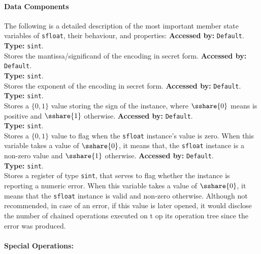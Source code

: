 \paragraph{Data Components}
The following is a detailed description of the most important member state variables of \verb|sfloat|, their behaviour, and properties:		
		\textbf{Accessed by:} \verb|Default|.\\
		\textbf{Type:} \verb|sint|.\\
		Stores the mantissa/significand of the encoding in secret form.
		\textbf{Accessed by:} \verb|Default|.\\
		\textbf{Type:} \verb|sint|.\\
		Stores the exponent of the encoding in secret form.
		\textbf{Accessed by:} \verb|Default|.\\
		\textbf{Type:} \verb|sint|.\\
		Stores a $\{0,1\}$ value storing the sign of the instance, where $\sshare{0}$ means is positive and $\sshare{1}$ otherwise.		
		\textbf{Accessed by:} \verb|Default|.\\
		\textbf{Type:} \verb|sint|.\\
		Stores a $\{0,1\}$ value to flag when the \verb|sfloat| instance's value is zero. 
		When this variable takes a value of $\sshare{0}$, it means that, the \verb|sfloat| instance is a non-zero value and $\sshare{1}$ otherwise.		
		\textbf{Accessed by:} \verb|Default|.\\
		\textbf{Type:} \verb|sint|.\\
		Stores a register of type \verb|sint|, 
		that serves to flag whether the instance is reporting a numeric error. 
		When this variable takes a value of $\sshare{0}$, 
		it means that the \verb|sfloat| instance is valid and non-zero otherwise. 
		Although not recommended, 
		in case of an error, if this value is later opened, 
		it would disclose the number of chained operations executed on t
		op its operation tree since the error was produced.
		
\paragraph{Special Operations:}

		
